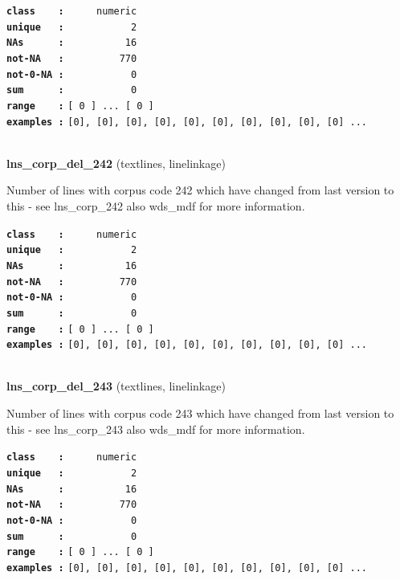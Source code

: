 \documentclass[]{article}
\begin{document}
\textbf{\texttt{class\ \ \ \ :}} \texttt{~~~~~numeric}\\
\textbf{\texttt{unique\ \ \ :}} \texttt{~~~~~~~~~~~2}\\
\textbf{\texttt{NAs\ \ \ \ \ \ :}} \texttt{~~~~~~~~~~16}\\
\textbf{\texttt{not-NA\ \ \ :}} \texttt{~~~~~~~~~770}\\
\textbf{\texttt{not-0-NA\ :}} \texttt{~~~~~~~~~~~0}\\
\textbf{\texttt{sum\ \ \ \ \ \ :}} \texttt{~~~~~~~~~~~0}\\
\textbf{\texttt{range\ \ \ \ :}}
\texttt{{[}\ 0\ {]}\ ...\ {[}\ 0\ {]}}\\
\textbf{\texttt{examples\ :}}
\texttt{{[}0{]},\ {[}0{]},\ {[}0{]},\ {[}0{]},\ {[}0{]},\ {[}0{]},\ {[}0{]},\ {[}0{]},\ {[}0{]},\ {[}0{]}\ ...}\\

~

\textbf{lns\_corp\_del\_242} (textlines, linelinkage)

Number of lines with corpus code 242 which have changed from last
version to this - see lns\_corp\_242 also wds\_mdf for more information.

\textbf{\texttt{class\ \ \ \ :}} \texttt{~~~~~numeric}\\
\textbf{\texttt{unique\ \ \ :}} \texttt{~~~~~~~~~~~2}\\
\textbf{\texttt{NAs\ \ \ \ \ \ :}} \texttt{~~~~~~~~~~16}\\
\textbf{\texttt{not-NA\ \ \ :}} \texttt{~~~~~~~~~770}\\
\textbf{\texttt{not-0-NA\ :}} \texttt{~~~~~~~~~~~0}\\
\textbf{\texttt{sum\ \ \ \ \ \ :}} \texttt{~~~~~~~~~~~0}\\
\textbf{\texttt{range\ \ \ \ :}}
\texttt{{[}\ 0\ {]}\ ...\ {[}\ 0\ {]}}\\
\textbf{\texttt{examples\ :}}
\texttt{{[}0{]},\ {[}0{]},\ {[}0{]},\ {[}0{]},\ {[}0{]},\ {[}0{]},\ {[}0{]},\ {[}0{]},\ {[}0{]},\ {[}0{]}\ ...}\\

~

\textbf{lns\_corp\_del\_243} (textlines, linelinkage)

Number of lines with corpus code 243 which have changed from last
version to this - see lns\_corp\_243 also wds\_mdf for more information.

\textbf{\texttt{class\ \ \ \ :}} \texttt{~~~~~numeric}\\
\textbf{\texttt{unique\ \ \ :}} \texttt{~~~~~~~~~~~2}\\
\textbf{\texttt{NAs\ \ \ \ \ \ :}} \texttt{~~~~~~~~~~16}\\
\textbf{\texttt{not-NA\ \ \ :}} \texttt{~~~~~~~~~770}\\
\textbf{\texttt{not-0-NA\ :}} \texttt{~~~~~~~~~~~0}\\
\textbf{\texttt{sum\ \ \ \ \ \ :}} \texttt{~~~~~~~~~~~0}\\
\textbf{\texttt{range\ \ \ \ :}}
\texttt{{[}\ 0\ {]}\ ...\ {[}\ 0\ {]}}\\
\textbf{\texttt{examples\ :}}
\texttt{{[}0{]},\ {[}0{]},\ {[}0{]},\ {[}0{]},\ {[}0{]},\ {[}0{]},\ {[}0{]},\ {[}0{]},\ {[}0{]},\ {[}0{]}\ ...}\\
\end{document}
